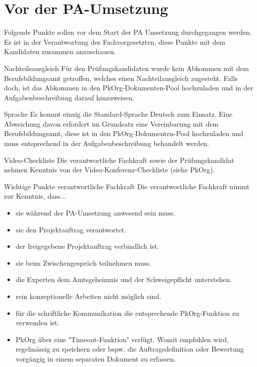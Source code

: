 \section{Vor der PA-Umsetzung}
Folgende Punkte sollen vor dem Start der PA Umsetzung durchgegangen werden. Es ist in der Verantwortung des Fachvorgesetzten,
diese Punkte mit dem Kandidaten zusammen anzuschauen.

\begin{taskitem}{Nachteilsausgleich}
Für den Prüfungskandidaten wurde kein Abkommen mit dem Berufsbildungsamt
getroffen, welches einen Nachteilausgleich zugesteht. Falls doch, ist das
Abkommen in den PkOrg-Dokumenten-Pool hochzuladen und in der
Aufgabenbeschreibung darauf hinzuweisen.
\end{taskitem}

\begin{taskitemwithoutcomment}{Sprache}
Es kommt einzig die Standard-Sprache Deutsch zum Einsatz.
Eine Abweichung davon erfordert im Grundsatz eine Vereinbarung mit dem
Berufsbildungsamt, diese ist in den PkOrg-Dokumenten-Pool hochzuladen und
muss entsprechend in der Aufgabenbeschreibung behandelt werden.
\end{taskitemwithoutcomment}

\begin{taskitemwithoutcomment}{Video-Checkliste}
Die verantwortliche Fachkraft sowie der Prüfungskandidat nehmen Kenntnis von
der Video-Konferenz-Checkliste (siehe PkOrg).
\end{taskitemwithoutcomment}

\begin{taskitemwithoutcomment}{Wichtige Punkte verantwortliche Fachkraft}
Die verantwortliche Fachkraft nimmt zur Kenntnis, dass...
\begin{itemize}
    \item sie während der PA-Umsetzung anwesend sein muss.
    \item sie den Projektauftrag verantwortet.
    \item der freigegebene Projektauftrag verbindlich ist.
    \item sie beim Zwischengespräch teilnehmen muss.
    \item die Experten dem Amtsgeheimnis und der Schweigepflicht unterstehen.
    \item rein konzeptionelle Arbeiten nicht möglich sind.
    \item für die schriftliche Kommunikation die entsprechende PkOrg-Funktion zu verwenden ist.
    \item PkOrg über eine "Timeout-Funktion" verfügt. Womit empfohlen wird,
          regelmässig zu speichern oder bspw. die Auftragsdefinition oder Bewertung
          vorgängig in einem separaten Dokument zu erfassen.
\end{itemize}
\end{taskitemwithoutcomment}

